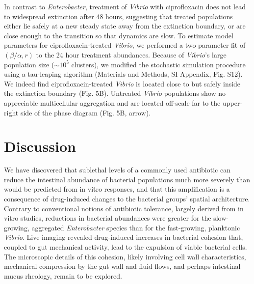 In contrast to \textit{Enterobacter}, treatment of \textit{Vibrio} with ciprofloxacin does not lead to widespread extinction after 48 hours, suggesting that treated populations either lie safely at a new steady state away from the extinction boundary, or are close enough to the transition so that dynamics are slow. To estimate model parameters for ciprofloxacin-treated \textit{Vibrio}, we performed a two parameter fit of $(\beta/\alpha, r)$ to the 24 hour treatment abundances. Because of \textit{Vibrio}'s large population size ($\sim 10^5$ clusters), we modified the stochastic simulation procedure using a tau-leaping algorithm (Materials and Methods, SI Appendix, Fig. S12). We indeed find ciprofloxacin-treated \textit{Vibrio} is located close to but safely inside the extinction boundary (Fig. 5B). Untreated \textit{Vibrio} populations show no appreciable multicellular aggregation and are located off-scale far to the upper-right side of the phase diagram (Fig. 5B, arrow).  



 \section{Discussion}

We have discovered that sublethal levels of a commonly used antibiotic can reduce the intestinal abundance of bacterial populations much more severely than would be predicted from in vitro responses, and that this amplification is a consequence of drug-induced changes to the bacterial groups' spatial architecture. Contrary to conventional notions of antibiotic tolerance, largely derived from in vitro studies, reductions in bacterial abundances were greater for the slow-growing, aggregated \textit{Enterobacter} species than for the fast-growing, planktonic \textit{Vibrio}. Live imaging revealed drug-induced increases in bacterial cohesion that, coupled to gut mechanical activity, lead to the expulsion of viable bacterial cells. The microscopic details of this cohesion, likely involving cell wall characteristics, mechanical compression by the gut wall and fluid flows, and perhaps intestinal mucus rheology, remain to be explored.

